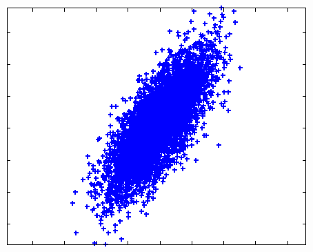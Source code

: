 \begin{frame}
\begin{columns}
\begin{column}{0.35\textwidth}
\begin{center}
        \includegraphics[width=\textwidth]{img/normal.png}
      \end{center}
    \end{column}
  \end{columns}
\end{frame}
